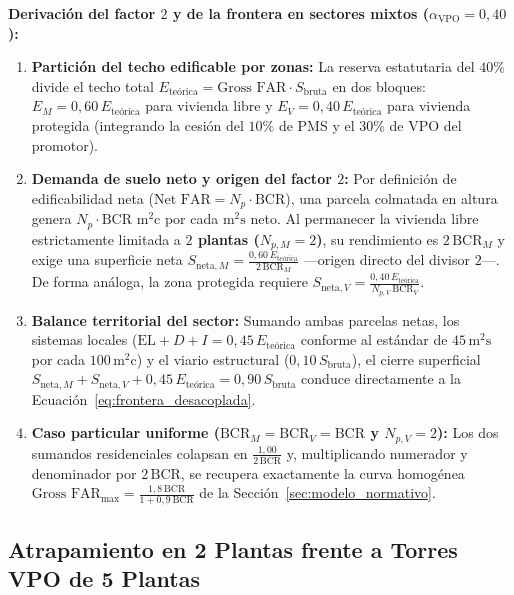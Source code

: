 \begin{tcolorbox}[notabox]
\textbf{Derivación del factor $2$ y de la frontera en sectores mixtos ($\alpha_{\text{VPO}} = 0{,}40$):}
\begin{enumerate}
  \item \textbf{Partición del techo edificable por zonas:} La reserva estatutaria del $40\%$ divide el techo total $E_{\text{teórica}} = \text{Gross FAR} \cdot S_{\text{bruta}}$ en dos bloques: $E_M = 0{,}60\,E_{\text{teórica}}$ para vivienda libre y $E_V = 0{,}40\,E_{\text{teórica}}$ para vivienda protegida (integrando la cesión del $10\%$ de PMS y el $30\%$ de VPO del promotor).
  \item \textbf{Demanda de suelo neto y origen del factor $2$:} Por definición de edificabilidad neta ($\text{Net FAR} = N_p \cdot \text{BCR}$), una parcela colmatada en altura genera $N_p \cdot \text{BCR}$ $\text{m}^2\text{c}$ por cada $\text{m}^2\text{s}$ neto. Al permanecer la vivienda libre estrictamente limitada a \textbf{$2$ plantas ($N_{p,M} = 2$)}, su rendimiento es $2\,\text{BCR}_M$ y exige una superficie neta $S_{\text{neta},M} = \frac{0{,}60\,E_{\text{teórica}}}{2\,\text{BCR}_M}$ ---origen directo del divisor $2$---. De forma análoga, la zona protegida requiere $S_{\text{neta},V} = \frac{0{,}40\,E_{\text{teórica}}}{N_{p,V}\,\text{BCR}_V}$.
  \item \textbf{Balance territorial del sector:} Sumando ambas parcelas netas, los sistemas locales ($\text{EL}+D+I = 0{,}45\,E_{\text{teórica}}$ conforme al estándar de $45\,\text{m}^2\text{s}$ por cada $100\,\text{m}^2\text{c}$) y el viario estructural ($0{,}10\,S_{\text{bruta}}$), el cierre superficial $S_{\text{neta},M} + S_{\text{neta},V} + 0{,}45\,E_{\text{teórica}} = 0{,}90\,S_{\text{bruta}}$ conduce directamente a la Ecuación~\eqref{eq:frontera_desacoplada}.
  \item \textbf{Caso particular uniforme ($\text{BCR}_M = \text{BCR}_V = \text{BCR}$ y $N_{p,V} = 2$):} Los dos sumandos residenciales colapsan en $\frac{1{,}00}{2\,\text{BCR}}$ y, multiplicando numerador y denominador por $2\,\text{BCR}$, se recupera exactamente la curva homogénea $\text{Gross FAR}_{\max} = \frac{1{,}8\,\text{BCR}}{1 + 0{,}9\,\text{BCR}}$ de la Sección~\ref{sec:modelo_normativo}.
\end{enumerate}
\end{tcolorbox}

\subsection{Atrapamiento en 2 Plantas frente a Torres VPO de 5 Plantas}
\label{sub:vpo_2f_5f}

